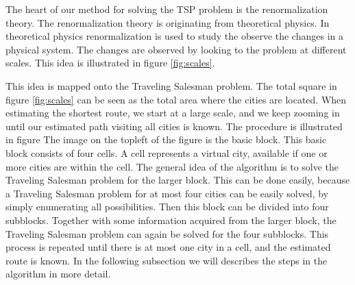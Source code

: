 The heart of our method for solving the TSP problem is the renormalization
theory. The renormalization theory is originating from theoretical physics. In
theoretical physics renormalization is used to study the observe the changes
in a physical system. The changes are observed by looking to the problem at
different scales. This idea is illustrated in figure \ref{fig:scales}.


This idea is mapped onto the Traveling Salesman problem. The total square in
figure \ref{fig:scales} can be seen as the total area where the cities are
located. When estimating the shortest route, we start at a large scale, and we
keep zooming in until our estimated path visiting all cities is known. The
procedure is illustrated in figure 
The image on the
topleft of the figure is the basic block. This basic block consists of four
cells. A cell represents a virtual city, available if one or more cities are
within the cell. The general idea of the algorithm is to solve the Traveling
Salesman problem for the larger block. This can be done easily, because a
Traveling Salesman problem for at most four cities can be easily solved, by
simply enumerating all possibilities. Then this block can be divided into four
subblocks. Together with some information acquired from the larger block, the
Traveling Salesman problem can again be solved for the four subblocks. This
process is repeated until there is at most one city in a cell, and the
estimated route is known. In the following subsection we will describes the
steps in the algorithm in more detail.

